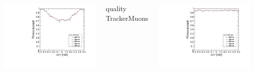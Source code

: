 \documentclass[compress]{beamer}
\begin{document}
\begin{frame}
\begin{columns}
\includegraphics[width=\linewidth]{barrel_dz_GlobalMuon.pdf}

\centering quality TrackerMuons

\includegraphics[width=\linewidth]{barrel_dz_TrackerMuon.pdf}
\end{columns}
\end{frame}
\end{document}
